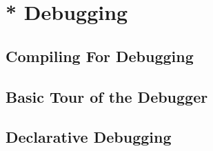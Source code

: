 
\chapter{* Debugging}
\section{Compiling For Debugging}
\section{Basic Tour of the Debugger}
\section{Declarative Debugging}



